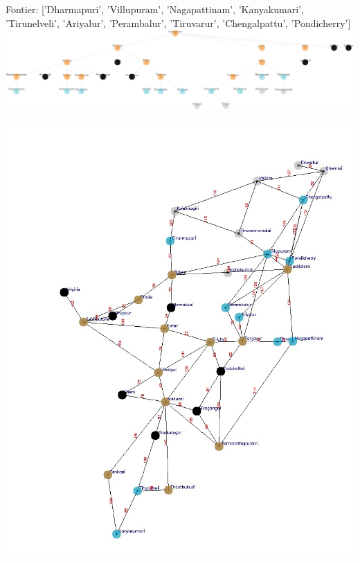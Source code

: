 \documentclass[xcolor=table]{beamer}
\begin{document}
\begin{frame}
  { \tiny Fontier: ['Dharmapuri', 'Villupuram', 'Nagapattinam', 'Kanyakumari', 'Tirunelveli', 'Ariyalur', 'Perambalur', 'Tiruvarur', 'Chengalpattu', 'Pondicherry']}
  \includegraphics[width=1\textwidth]{../BFSNodes/28-1.png}
  \begin{center}
    \includegraphics[height=0.55\textheight]{../BFSoutput/tamilBFS26.jpg}
  \end{center}
\end{frame}
\end{document}
